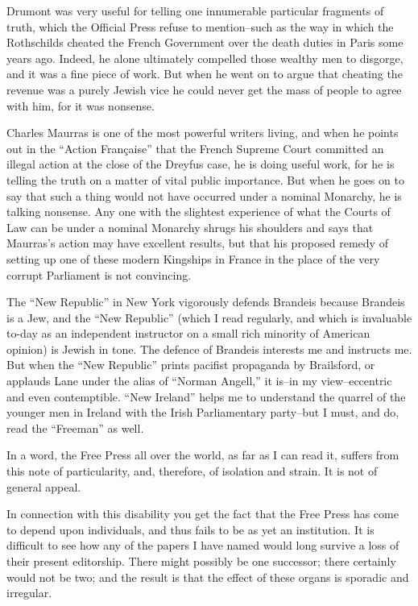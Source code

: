 \documentclass{book}
\begin{document}
Drumont was very useful for telling one innumerable particular fragments of truth, which the Official Press refuse to mention–such as the way in which the Rothschilds cheated the French Government over the death duties in Paris some years ago. Indeed, he alone ultimately compelled those wealthy men to disgorge, and it was a fine piece of work. But when he went on to argue that cheating the revenue was a purely Jewish vice he could never get the mass of people to agree with him, for it was nonsense.

Charles Maurras is one of the most powerful writers living, and when he points out in the “Action Française” that the French Supreme Court committed an illegal action at the close of the Dreyfus case, he is doing useful work, for he is telling the truth on a matter of vital public importance. But when he goes on to say that such a thing would not have occurred under a nominal Monarchy, he is talking nonsense. Any one with the slightest experience of what the Courts of Law can be under a nominal Monarchy shrugs his shoulders and says that Maurras’s action may have excellent results, but that his proposed remedy of setting up one of these modern Kingships in France in the place of the very corrupt Parliament is not convincing.

The “New Republic” in New York vigorously defends Brandeis because Brandeis is a Jew, and the “New Republic” (which I read regularly, and which is invaluable to-day as an independent instructor on a small rich minority of American opinion) is Jewish in tone. The defence of Brandeis interests me and instructs me. But when the “New Republic” prints pacifist propaganda by Brailsford, or applauds Lane under the alias of “Norman Angell,” it is–in my view–eccentric and even contemptible. “New Ireland” helps me to understand the quarrel of the younger men in Ireland with the Irish Parliamentary party–but I must, and do, read the “Freeman” as well.

In a word, the Free Press all over the world, as far as I can read it, suffers from this note of particularity, and, therefore, of isolation and strain. It is not of general appeal.

In connection with this disability you get the fact that the Free Press has come to depend upon individuals, and thus fails to be as yet an institution. It is difficult to see how any of the papers I have named would long survive a loss of their present editorship. There might possibly be one successor; there certainly would not be two; and the result is that the effect of these organs is sporadic and irregular.
\end{document}
